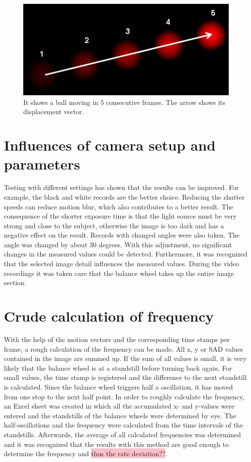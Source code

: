 \documentclass[12pt, a4paper]{report}
\begin{document}
    \noindent
    \begin{figure}[H]
    \centering
    \includegraphics[scale=0.7]{Images/optical_flow_basic1.jpg}
    
    \caption{It shows a ball moving in 5 consecutive frames. The arrow shows its displacement vector.}
    \end{figure}
    
    \section{Influences of camera setup and parameters}
    Testing with different settings has shown that the results can be improved. For example, the black and white records are the better choice. Reducing the shutter speeds can reduce motion blur, which also contributes to a better result.
    The consequence of the shorter exposure time is that the light source must be very strong and close to the subject, otherwise the image is too dark and has a negative effect on the result.
    Records with changed angles were also taken. The angle was changed by about 30 degrees. With this adjustment, no significant changes in the measured values could be detected.
    Furthermore, it was recognized that the selected image detail influences the measured values. During the video recordings it was taken care that the balance wheel takes up the entire image section.
    \newpage

    \section{Crude calculation of frequency}
    With the help of the motion vectors and the corresponding time stamps per frame, a rough calculation of the frequency can be made. All x, y or SAD values contained in the image are summed up. If the sum of all values is small, it is very likely that the balance wheel is at a standstill before turning back again. For small values, the time stamp is registered and the difference to the next standstill is calculated. Since the balance wheel triggers half a oscillation, it has moved from one stop to the next half point. 
    In order to roughly calculate the frequency, an Excel sheet was created in which all the accumulated x- and y-values were entered and the standstills of the balance wheels were determined by eye. The half-oscillations and the frequency were calculated from the time intervals of the standstills. Afterwards, the average of all calculated frequencies was determined and it was recognized that the results with this method are good enough to determine the frequency and \colorbox{pink}{thus the rate deviation??}. 
    
\end{document}
